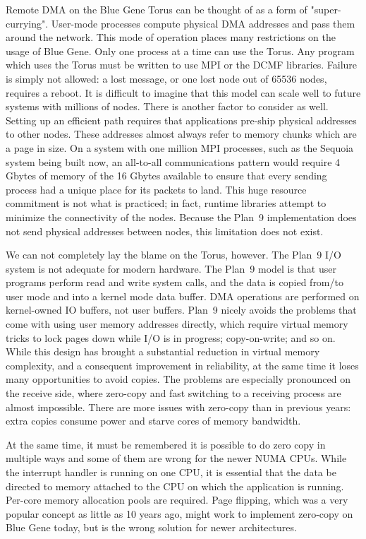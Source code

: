 \documentclass[a4,10pt,preprint]{sigplanconf}
\begin{document}
Remote DMA on the Blue Gene Torus can be thought of as a form of "super-currying". User-mode processes compute physical DMA addresses and pass them around the network. This mode of operation places many restrictions on the usage of Blue Gene. Only one process at a time can use the Torus. Any program which uses the Torus must be written to use MPI or the DCMF libraries. Failure is simply not allowed: a lost message, or one lost node out of 65536 nodes, requires a reboot. It is difficult to imagine that this model can scale well to future systems with millions of nodes. 
There is another factor to consider as well. Setting up an efficient path requires that applications pre-ship physical addresses to other nodes. These addresses almost always refer to 
memory chunks which are a page in size. On a system with one million MPI processes, such as the Sequoia system being built now, an all-to-all communications pattern would require 4 Gbytes of memory of the 16 Gbytes available to ensure that every sending process had a unique place for its packets to land. This huge resource commitment is not what is practiced; in fact, runtime libraries attempt to minimize the connectivity of the nodes. Because the Plan~9 implementation does not send physical addresses between nodes, this limitation
does not exist.

We can not completely lay the blame on the Torus, however. The Plan~9 I/O system is not adequate for modern hardware. The Plan~9 model is that user programs perform read and write system calls, and the data is copied from/to user mode and into a kernel mode data buffer. DMA operations are performed on kernel-owned IO buffers, not user buffers. Plan~9 nicely avoids the problems that come with using user memory addresses directly, which require virtual memory tricks to lock pages down while I/O is in progress; copy-on-write; and so on. While this design has brought a substantial reduction in virtual memory complexity, and a consequent improvement in reliability, at the same time it loses many opportunities to avoid copies. The problems are especially pronounced on the receive side, where zero-copy and fast switching to a receiving process are almost impossible. There are more issues with zero-copy than in previous years: extra copies consume power and starve cores of memory bandwidth. 

At the same time, it must be remembered it is possible to do zero copy in multiple ways and some of them are wrong for the newer NUMA CPUs. While the interrupt handler is running on one CPU, it is essential that the data be directed to memory attached to the  CPU on which the application is running. Per-core memory allocation pools are required. Page flipping, which was a very popular concept as little as 10 years ago, might work to implement zero-copy on Blue Gene today, but is the wrong solution for newer architectures. 
\end{document}
